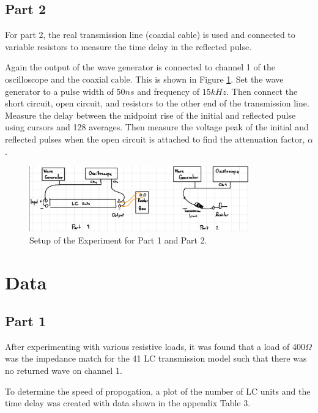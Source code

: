 \documentclass[12pt]{article}
\begin{document}
\subsection{Part 2}
For part 2, the real transmission line (coaxial cable) is used and connected to variable resistors to measure the time delay in the reflected pulse. 

Again the output of the wave generator is connected to channel 1 of the oscilloscope and the coaxial cable. This is shown in Figure \ref{fig:setup}. 
Set the wave generator to a pulse width of $50ns$ and frequency of $15kHz$. Then connect the short circuit, open circuit, and resistors to the other end of the transmission line. Measure the delay between the midpoint rise of the initial and reflected pulse using cursors and 128 averages. 
Then measure the voltage peak of the initial and reflected pulses when the open circuit is attached to find the attenuation factor, $\alpha$. 

\begin{figure}[H]
    \centering
    \includegraphics[width=0.85\textwidth]{img/method.jpeg}
    \caption{Setup of the Experiment for Part 1 and Part 2.}
    \label{fig:setup}
\end{figure}

\section{Data}
\subsection*{Part 1}
After experimenting with various resistive loads, it was found that a load of 400$\Omega$ was the impedance match for the 41 LC transmission model such that there was no returned wave on channel 1.

To determine the speed of propogation, a plot of the number of LC units and the time delay was created with data shown in the appendix Table 3.
\end{document}
